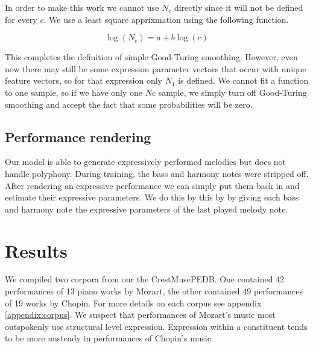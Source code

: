 \documentclass[a4paper,10pt]{article}
\begin{document}
In order to make this work we cannot use $N_c$ directly since it will not be defined for every $c$. We use a least square apprixmation using the following function. 

\[\log(N_c) = a + b \log(c)\]

This completes the definition of simple Good-Turing smoothing. However, even now there may still be some expression parameter vectors that occur with unique feature vectors, so for that expression only $N_1$ is defined. We cannot fit a function to one sample, so if we have only one $Nc$ sample, we simply turn off Good-Turing smoothing and accept the fact that some probabilities will be zero. 

\subsection{Performance rendering}

Our model is able to generate expressively performed melodies but does not handle polyphony. During training, the bass and harmony notes were stripped off. After rendering an expressive performance we can simply put them back in and estimate their expressive parameters. We do this by this by by giving each  bass and harmony note the expressive parameters of the last played melody note. 


\section{Results}
\label{sec:results}

We compiled two corpora from our the CrestMusePEDB. One contained 42 performances of 13 piano works by Mozart, the other contained 49 performances of 19 works by Chopin. For more details on each corpus see appendix \ref{appendix:corpus}. We suspect that performances of Mozart's music most outspokenly use structural level expression. Expression within a constituent tends to be more unsteady in performances of Chopin's music. 
\end{document}
